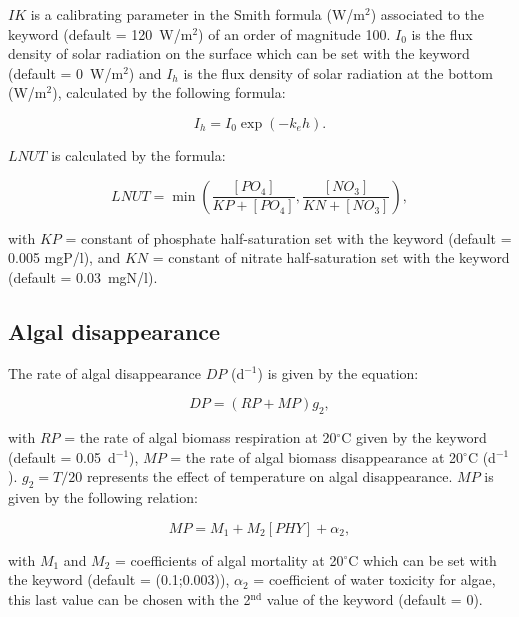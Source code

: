 $IK$ is a calibrating parameter in the Smith formula (W/m$^2$)
associated to the keyword 
(default = 120~W/m$^2$) of an order of magnitude 100.
$I_0$ is the flux density of solar radiation on the surface
which can be set with the keyword 
(default = 0~W/m$^2$)
and $I_h$ is the flux density of solar radiation at the bottom (W/m$^2$), calculated by the following formula:

\begin{equation*}
  I_h = I_0 \exp (-k_e h).
\end{equation*}

$LNUT$ is calculated by the formula:

\begin{equation*}
  LNUT = \min \left( \frac{[PO_4]}{KP+[PO_4]}, \frac{[NO_3]}{KN+[NO_3]} \right),
\end{equation*}

with $KP$ = constant of phosphate half-saturation
set with the keyword 
(default = 0.005 mgP/l),
and $KN$ = constant of nitrate half-saturation
set with the keyword 
(default = 0.03~mgN/l).\\

\subsection{Algal disappearance}

The rate of algal disappearance $DP$ (d$^{-1}$) is given by the equation:

\begin{equation*}
  DP = (RP+MP) g_2,
\end{equation*}

with $RP$ = the rate of algal biomass respiration at 20$^{\circ}$C
given by the keyword 
(default = 0.05~d$^{-1}$),
$MP$ = the rate of algal biomass disappearance at 20$^{\circ}$C (d$^{-1}$).
$g_2 = T/20$ represents the effect of temperature on algal disappearance.
$MP$ is given by the following relation:

\begin{equation*}
  MP = M_1 + M_2 [PHY] + \alpha_2,
\end{equation*}

with $M_1$ and $M_2$ = coefficients of algal mortality at 20$^{\circ}$C
which can be set with the keyword
 (default = (0.1;0.003)),
$\alpha_2$ = coefficient of water toxicity for algae,
this last value can be chosen with the 2$^{\textrm{nd}}$ value of the keyword
 (default = 0).


